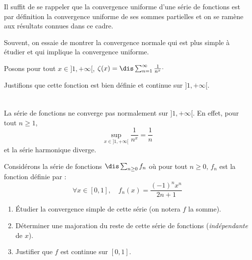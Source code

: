 \documentclass[a4paper,10pt]{report}
\begin{document}
\begin{preuve} 
Il suffit de se rappeler que la convergence uniforme d'une série de fonctions est par définition la convergence uniforme de ses sommes partielles et on se ramène aux résultats connues dans ce cadre.
\end{preuve}

\begin{rem} Souvent, on essaie de montrer la convergence normale qui est plus simple à étudier et qui implique la convergence uniforme.
\end{rem}

\begin{ex} Posons pour tout $x \in ]1, + \infty[$, $\zeta(x) = \dis \sum_{n=1}^{\infty} \frac{1}{n^x} \cdot$

\noindent Justifions que cette fonction est bien définie et continue sur $]1, + \infty[$.

\medskip
%
%
%
%

\vspace{8cm}
\newpage

$\phantom{test}$

\vspace{5cm}
\end{ex}

\begin{rem}
La série de fonctions ne converge pas normalement sur $]1, + \infty[$. En effet, pour tout $n \geq 1$,
$$ \sup_{x \in ]1, + \infty[} \frac{1}{n^x} = \frac{1}{n}$$
et la série harmonique diverge.
\end{rem}

\begin{exa} Considérons la série de fonctions $\dis \sum_{n \geq 0} f_n$ où pour tout $n \geq 0$, $f_n$ est la fonction définie par :
$$  \forall x \in [0,1], \quad f_n(x) = \frac{(-1)^n x^n}{2n+1}$$
\begin{enumerate}
\item Étudier la convergence simple de cette série (on notera $f$ la somme).
\item Déterminer une majoration du reste de cette série de fonctions (\textit{indépendante} de $x$).
\item Justifier que $f$ est continue sur $[0,1]$.
\end{enumerate}
\end{exa}
\end{document}
